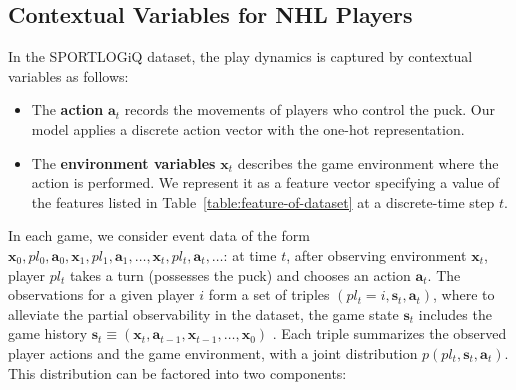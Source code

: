 \documentclass[letterpaper]{article} %
\newcommand{\generation}{p}
\newcommand{\state}{\mathbf{s}}
\newcommand{\action}{\mathbf{a}}
\newcommand{\reward}{r}
\newcommand{\player}{pl}
\newcommand{\pindex}{i}
\newcommand{\features}{\mathbf{x}}
\begin{document}
\subsection{Contextual Variables for NHL Players}
In the SPORTLOGiQ dataset, the play dynamics is captured by contextual variables as follows:
\begin{itemize}
\item The \textbf{action} $\action_t$ records the movements of players who control the puck. Our model applies a discrete action vector with the one-hot representation. 
\item The \textbf{environment variables} $\features_{t}$ describes the game environment where the action is performed. We represent it as a feature vector specifying a value of the features listed in Table~\ref{table:feature-of-dataset} at a discrete-time step $t$. 
\end{itemize}

In each game, we consider event data of the form
$\features_0,\player_0,\action_0,\features_1,\player_1,\action_1,\ldots,\features_{t},\player_{t},\action_{t},\ldots$:
at time $t$, after observing environment $\features_{t}$, player $\player_{t}$ takes a turn (possesses the puck) and chooses an action $\action_{t}$.
The observations for a given player $\pindex$ 
form a set of triples $(\player_{t} = \pindex, \state_{t}, \action_{t})$, where to alleviate the partial observability in the dataset, the game state $\state_{t}$ includes the game history $\state_{t} \equiv (\features_t,\action_{t-1},\features_{t-1},\ldots,\features_0)$ \cite{Liu2018,littlestone}.
Each triple summarizes the observed player actions and the game environment, with a joint distribution $\generation(\player_{t}, \state_{t}, \action_{t})$. This distribution can be factored into two components:
\end{document}
